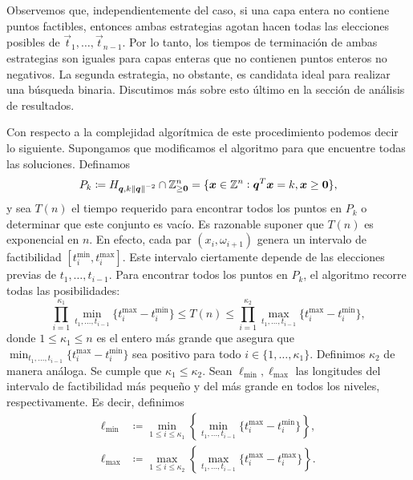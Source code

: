 Observemos que, independientemente del caso, si una capa entera no contiene puntos factibles, entonces
ambas estrategias agotan hacen todas las elecciones posibles de $\vec{t}_1, \ldots, \vec{t}_{n-1}$.
Por lo tanto, los tiempos de terminación de ambas estrategias son iguales para capas enteras que no
contienen puntos enteros no negativos. La segunda estrategia, no obstante, es candidata ideal para
realizar una búsqueda binaria. Discutimos más sobre esto último en la sección de análisis de
resultados.

Con respecto a la complejidad algorítmica de este procedimiento podemos decir lo siguiente.
Supongamos que modificamos el algoritmo para que encuentre todas las soluciones. Definamos
\begin{equation}
	\label{phase-1:def:feasible-layer}
	P_k \coloneq H_{\boldsymbol{q}, k\left\lVert \boldsymbol{q} \right\rVert^{-2}} \cap \mathbb{Z}_{\geq \boldsymbol{0}}^n
	=
	\lbrace \boldsymbol{x} \in \mathbb{Z}^n \vcentcolon \boldsymbol{q}^T\boldsymbol{x} = k, \boldsymbol{x} \geq \boldsymbol{0}
	\rbrace,
\end{equation}
y sea $T(n)$ el tiempo requerido para encontrar todos los puntos en $P_k$ o determinar que este
conjunto es vacío. Es razonable suponer que $T(n)$ es exponencial en $n$. En efecto, cada par $(x_i,
\omega_{i + 1})$ genera un intervalo de factibilidad $[t_i^{\min}, t_i^{\max}]$. Este intervalo
ciertamente depende de las elecciones previas de $t_1, \ldots, t_{i - 1}$. Para encontrar todos los
puntos en $P_k$, el algoritmo recorre todas las posibilidades:
\begin{equation}
	\label{phase-1:complexity:bounds}
	\prod_{i=1}^{\kappa_1} \min_{t_1, \ldots, t_{i-1}} \lbrace t_i^{\max} - t_i^{\min} \rbrace
	\leq T(n) \leq
	\prod_{i=1}^{\kappa_2} \max_{t_1, \ldots, t_{i-1}} \lbrace t_i^{\max} - t_i^{\min} \rbrace,
\end{equation}
donde $1 \leq \kappa_1 \leq n$ es el entero más grande que asegura que  $\min_{t_1, \ldots, t_{i -
1}}\lbrace t_i^{\max} - t_i^{\min} \rbrace$ sea positivo para todo $i \in \lbrace 1, \ldots, \kappa_1
\rbrace$. Definimos $\kappa_2$ de manera análoga. Se cumple que $\kappa_1 \leq \kappa_2$. Sean
$\ell_{\min}, \ell_{\max}$ las longitudes del intervalo de factibilidad más pequeño y del más grande
en todos los niveles, respectivamente. Es decir, definimos
\begin{align}
	\ell_{\min} &\coloneq \min_{1 \leq i \leq \kappa_1} \left\lbrace \min_{t_1, \ldots, t_{i - 1}} \lbrace
	t_i^{\max} - t_i^{\min} \rbrace \right\rbrace,
	\\
	\ell_{\max} &\coloneq \max_{1 \leq i \leq \kappa_2} \left\lbrace \max_{t_1, \ldots, t_{i - 1}} \lbrace
	t_i^{\max} - t_i^{\max} \rbrace \right\rbrace.
\end{align}
